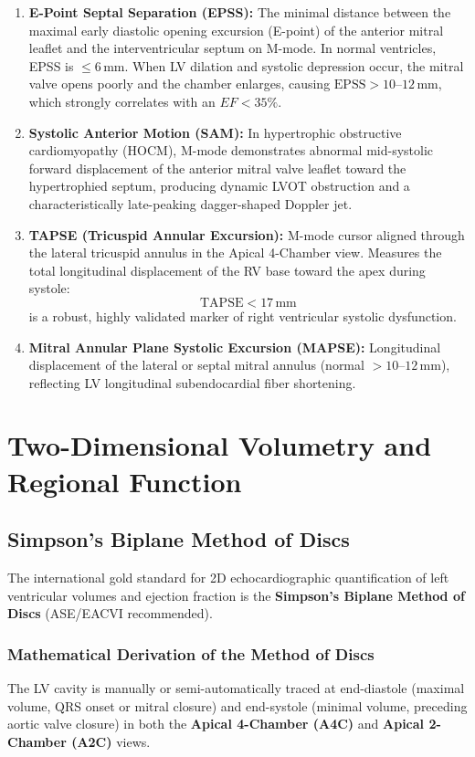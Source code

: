 \documentclass[11pt,a4paper]{article}
\begin{document}
\begin{enumerate}[leftmargin=*]
    \item \textbf{E-Point Septal Separation (EPSS):} The minimal distance between the maximal early diastolic opening excursion (E-point) of the anterior mitral leaflet and the interventricular septum on M-mode. In normal ventricles, EPSS is $\le 6\,\text{mm}$. When LV dilation and systolic depression occur, the mitral valve opens poorly and the chamber enlarges, causing $\text{EPSS} > 10\text{--}12\,\text{mm}$, which strongly correlates with an $EF < 35\%$.
    \item \textbf{Systolic Anterior Motion (SAM):} In hypertrophic obstructive cardiomyopathy (HOCM), M-mode demonstrates abnormal mid-systolic forward displacement of the anterior mitral valve leaflet toward the hypertrophied septum, producing dynamic LVOT obstruction and a characteristically late-peaking dagger-shaped Doppler jet.
    \item \textbf{TAPSE (Tricuspid Annular Excursion):} M-mode cursor aligned through the lateral tricuspid annulus in the Apical 4-Chamber view. Measures the total longitudinal displacement of the RV base toward the apex during systole:
    \begin{equation}
        \text{TAPSE} < 17\,\text{mm}
    \end{equation}
    is a robust, highly validated marker of right ventricular systolic dysfunction.
    \item \textbf{Mitral Annular Plane Systolic Excursion (MAPSE):} Longitudinal displacement of the lateral or septal mitral annulus (normal $> 10\text{--}12\,\text{mm}$), reflecting LV longitudinal subendocardial fiber shortening.
\end{enumerate}

\newpage
\section{Two-Dimensional Volumetry and Regional Function}

\subsection{Simpson's Biplane Method of Discs}

The international gold standard for 2D echocardiographic quantification of left ventricular volumes and ejection fraction is the \textbf{Simpson's Biplane Method of Discs} (ASE/EACVI recommended).

\subsubsection{Mathematical Derivation of the Method of Discs}
The LV cavity is manually or semi-automatically traced at end-diastole (maximal volume, QRS onset or mitral closure) and end-systole (minimal volume, preceding aortic valve closure) in both the \textbf{Apical 4-Chamber (A4C)} and \textbf{Apical 2-Chamber (A2C)} views.
\end{document}

